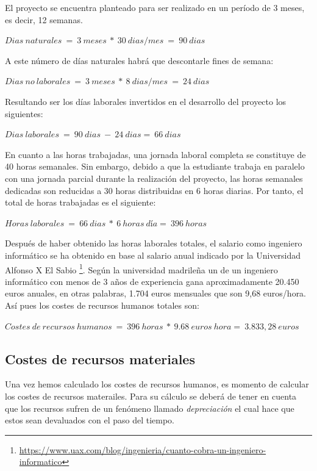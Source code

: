 El proyecto se encuentra planteado para ser realizado en un período de 3 meses, es decir, 12 semanas. 

\begin{center}
$Dias\ naturales\ =\ 3\ meses\ *\ 30\ dias / mes\ =\ 90\ dias$
\end{center}

A este número de días naturales habrá que descontarle fines de semana:

\begin{center}
$Dias\ no \ laborales\ =\ 3\ meses\ *\ 8\ dias / mes\ =\ 24\ dias$
\end{center}

Resultando ser los días laborales invertidos en el desarrollo del proyecto los siguientes:

\begin{center}
$Dias\ laborales\ =\ 90\ dias\ -\ 24\ dias =\ 66 \ dias$
\end{center}

En cuanto a las horas trabajadas, una jornada laboral completa se constituye de 40 horas semanales. Sin embargo, debido a que la estudiante trabaja en paralelo con una jornada parcial durante la realización del proyecto, las horas semanales dedicadas son reducidas a 30 horas distribuidas en 6 horas diarias. Por tanto, el total de horas trabajadas es el siguiente:

\begin{center}
$Horas\ laborales\ =\ 66\ dias\ *\ 6 \ horas\ día = \ 396 \ horas$
\end{center}

Después de haber obtenido las horas laborales totales, el salario como ingeniero informático se ha obtenido en base al salario anual indicado por la Universidad Alfonso X El Sabio \footnote{\url{https://www.uax.com/blog/ingenieria/cuanto-cobra-un-ingeniero-informatico}}. Según la universidad madrileña un de un ingeniero informático con menos de 3 años de experiencia gana aproximadamente 20.450 euros anuales, en otras palabras, 1.704 euros mensuales que son 9,68 euros/hora. Así pues los costes de recursos humanos totales son:

\begin{center}
$Costes\ de \ recursos \ humanos \ =\ 396\ horas\ *\ 9.68 \ euros\ hora = \ 3.833,28 \ euros$
\end{center}

\subsection{Costes de recursos materiales}
Una vez hemos calculado los costes de recursos humanos, es momento de calcular los costes de recursos materailes. Para su cálculo se deberá de tener en cuenta que los recursos sufren de un fenómeno llamado \textit{depreciación} el cual hace que estos sean devaluados con el paso del tiempo. 

